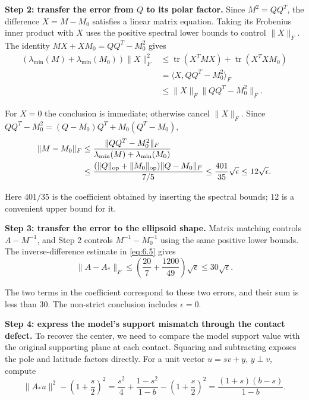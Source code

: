 \textbf{Step 2: transfer the error from $Q$ to its polar factor.} Since $M^2=QQ^T$,
the difference $X=M-M_0$ satisfies a linear matrix equation. Taking its
Frobenius inner product with $X$ uses the positive spectral lower bounds to
control $\|X\|_F$. The identity $MX+XM_0=QQ^T-M_0^2$ gives
\begin{equation}\label{eq:9.16}
\begin{aligned}
(\lambda_{\min}(M)+\lambda_{\min}(M_0))\|X\|_F^2
&\le\operatorname{tr}(X^TMX)+\operatorname{tr}(X^TXM_0)\\
&=\langle X,QQ^T-M_0^2\rangle_F\\
&\le\|X\|_F\|QQ^T-M_0^2\|_F.
\end{aligned}
\end{equation}

For $X=0$ the conclusion is immediate; otherwise cancel $\|X\|_F$. Since
$QQ^T-M_0^2=(Q-M_0)Q^T+M_0(Q^T-M_0)$,
\begin{equation}\label{eq:9.17}
\begin{aligned}
\|M-M_0\|_F
&\le\frac{\|QQ^T-M_0^2\|_F}
{\lambda_{\min}(M)+\lambda_{\min}(M_0)}\\
&\le\frac{(\|Q\|_{\rm op}+\|M_0\|_{\rm op})\|Q-M_0\|_F}{7/5}
\le\frac{401}{35}\sqrt\epsilon
\le12\sqrt\epsilon.
\end{aligned}
\end{equation}

Here $401/35$ is the coefficient obtained by inserting the spectral bounds;
$12$ is a convenient upper bound for it.

\textbf{Step 3: transfer the error to the ellipsoid shape.} Matrix matching
controls $A-M^{-1}$, and Step 2 controls $M^{-1}-M_0^{-1}$ using the same
positive lower bounds. The inverse-difference estimate in \eqref{eq:6.5} gives
\begin{equation}\label{eq:9.18}
\|A-A_*\|_F
\le\left(\frac{20}{7}+\frac{1200}{49}\right)\sqrt\epsilon
\le30\sqrt\epsilon.
\end{equation}

The two terms in the coefficient correspond to these two errors, and their
sum is less than $30$. The non-strict conclusion includes $\epsilon=0$.

\textbf{Step 4: express the model's support mismatch through the contact defect.}
To recover the center, we need to compare the model support value with the
original supporting plane at each contact. Squaring and subtracting exposes
the pole and latitude factors directly. For a unit vector $u=sv+y$, $y\perp v$,
compute
\begin{equation}\label{eq:9.19}
\|A_*u\|^2-\left(1+\frac s2\right)^2
=\frac{s^2}{4}+\frac{1-s^2}{1-b}-\left(1+\frac s2\right)^2
=\frac{(1+s)(b-s)}{1-b}.
\end{equation}


